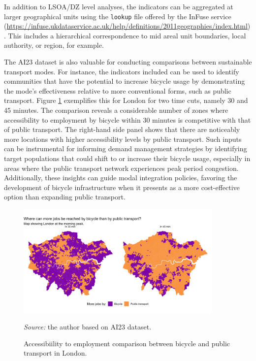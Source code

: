 \documentclass{article}
\begin{document}
In addition to LSOA/DZ level analyses, the indicators can be aggregated
at larger geographical units using the \texttt{lookup} file offered by
the InFuse service
(\url{https://infuse.ukdataservice.ac.uk/help/definitions/2011geographies/index.html}).
This includes a hierarchical correspondence to mid areal unit
boundaries, local authority, or region, for example.

The AI23 dataset is also valuable for conducting comparisons between
sustainable transport modes. For instance, the indicators included can
be used to identify communities that have the potential to increase
bicycle usage by demonstrating the mode's effectiveness relative to more
conventional forms, such as public transport. Figure
\ref{fig:bike-comparison} exemplifies this for London for two time cuts,
namely 30 and 45 minutes. The comparison reveals a considerable number
of zones where accessibility to employment by bicycle within 30 minutes
is competitive with that of public transport. The right-hand side panel
shows that there are noticeably more locations with higher accessibility
levels by public transport. Such inputs can be instrumental for
informing demand management strategies by identifying target populations
that could shift to or increase their bicycle usage, especially in areas
where the public transport network experiences peak period congestion.
Additionally, these insights can guide modal integration policies,
favoring the development of bicycle infrastructure when it presents as a
more cost-effective option than expanding public transport.

\begin{figure}[!htbp]
  \centering
  \includegraphics[width=0.9\textwidth]{../plots/pt_vs_bike_map}
  \caption{Accessibiility to employment comparison between bicycle and public transport in London.}
  \footnotesize{\textit{Source:} the author based on AI23 dataset.}
  \label{fig:bike-comparison}
\end{figure}
\end{document}
